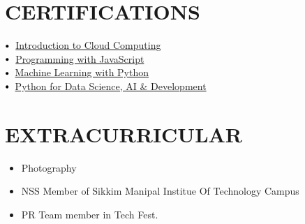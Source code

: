 \documentclass[letterpaper,11pt]{article}
\makeatletter
\newcommand{\resumeItem}[1]{
  \item\small{
    {#1 \vspace{-2pt}}
  }
}
\newcommand{\resumeSubheading}[4]{
  \vspace{-2pt}\item
    \begin{tabular*}{1.0\textwidth}[t]{l@{\extracolsep{\fill}}r}
      \textbf{\large#1} & \textbf{\small #2} \\
      \textit{\large#3} & \textit{\small #4} \\
      
    \end{tabular*}\vspace{-7pt}
}
\newcommand{\resumeSubHeadingListStart}{\begin{itemize}[leftmargin=0.0in, label={}]}
\newcommand{\resumeSubHeadingListEnd}{\end{itemize}}
\newcommand{\resumeItemListStart}{\begin{itemize}}
\newcommand{\resumeItemListEnd}{\end{itemize}\vspace{-5pt}}
\newcommand\sbullet[1][.5]{\mathbin{\vcenter{\hbox{\scalebox{#1}{$\bullet$}}}}}
\makeatother
\begin{document}
\section{CERTIFICATIONS}

$\sbullet[.75] \hspace{0.1cm}$ {\href{https://drive.google.com/file/d/1pKJjXHSbSMMN63ageE9X6AupstV829_d/view?usp=sharing}{Introduction to Cloud Computing}} \hspace{2.59cm}\\
$\sbullet[.75] \hspace{0.1cm}$ {\href{https://drive.google.com/file/d/1pg4CgmEscejt8HvbELdyoMnskO32IRIC/view?usp=sharing}{Programming with JavaScript}} \hspace{1.6cm}\\
$\sbullet[.75] \hspace{0.2cm}${\href{https://drive.google.com/file/d/1Zeg8vhK7CZ09M4rbzmqnZnvikdkqSP41/view?usp=sharing}{Machine Learning with Python}} \hspace{1cm}\\
$\sbullet[.75] \hspace{0.2cm}${\href{https://drive.google.com/file/d/1zm3pXHNoyp9gBvYVu_0NsYba7dxpS6yJ/view?usp=sharing}{Python for Data Science, AI & Development}} \hspace{1cm}\\




 \section{EXTRACURRICULAR}
    \resumeSubHeadingListStart
        
            \resumeItemListStart
                \resumeItem{\normalsize{Photography}}
                \resumeItem{\normalsize{NSS Member of Sikkim Manipal Institue Of Technology Campus }}
                \resumeItem{\normalsize{PR Team member in Tech Fest.}}
            \resumeItemListEnd
    \resumeSubHeadingListEnd
 \vspace{-11pt}
 
 
\end{document}
